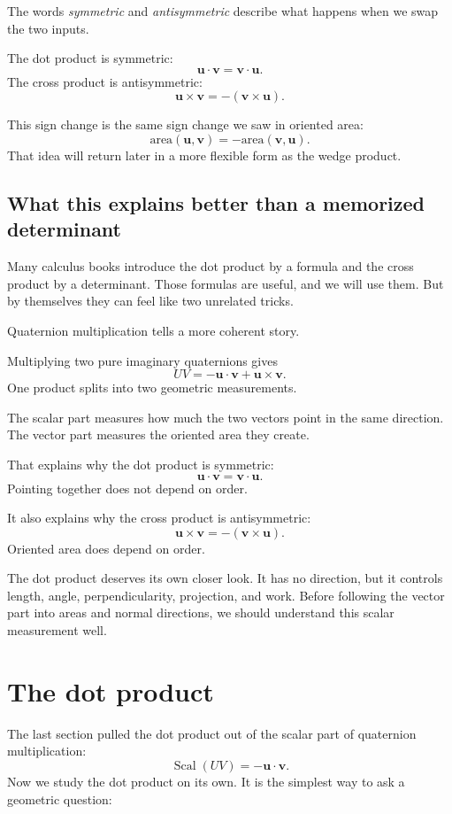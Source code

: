The words \emph{symmetric} and \emph{antisymmetric} describe what happens when we
swap the two inputs.

The dot product is symmetric:
\[
    \mathbf u\cdot\mathbf v=\mathbf v\cdot\mathbf u.
\]
The cross product is antisymmetric:
\[
    \mathbf u\times\mathbf v=-(\mathbf v\times\mathbf u).
\]

This sign change is the same sign change we saw in oriented area:
\[
    \text{area}(\mathbf u,\mathbf v)
    =
    -\text{area}(\mathbf v,\mathbf u).
\]
That idea will return later in a more flexible form as the wedge product.

\subsection{What this explains better than a memorized determinant}

Many calculus books introduce the dot product by a formula and the cross product by
a determinant.  Those formulas are useful, and we will use them.  But by themselves
they can feel like two unrelated tricks.

Quaternion multiplication tells a more coherent story.

Multiplying two pure imaginary quaternions gives
\[
    UV=-\mathbf u\cdot\mathbf v+\mathbf u\times\mathbf v.
\]
One product splits into two geometric measurements.

The scalar part measures how much the two vectors point in the same direction.
The vector part measures the oriented area they create.

That explains why the dot product is symmetric:
\[
    \mathbf u\cdot\mathbf v=\mathbf v\cdot\mathbf u.
\]
Pointing together does not depend on order.

It also explains why the cross product is antisymmetric:
\[
    \mathbf u\times\mathbf v=-(\mathbf v\times\mathbf u).
\]
Oriented area does depend on order.

The dot product deserves its own closer look.  It has no direction, but it controls
length, angle, perpendicularity, projection, and work.  Before following the vector
part into areas and normal directions, we should understand this scalar measurement
well.

\section{The dot product}

The last section pulled the dot product out of the scalar part of quaternion
multiplication:
\[
    \operatorname{Scal}(UV)=-\mathbf u\cdot\mathbf v.
\]
Now we study the dot product on its own.  It is the simplest way to ask a geometric
question:

